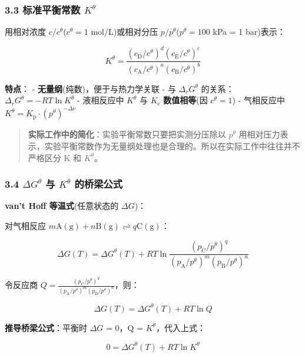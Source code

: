 \subsubsection{\texorpdfstring{3.3 标准平衡常数 \(K^\theta\)}{3.3 标准平衡常数 K\^{}\textbackslash theta}}\label{ux6807ux51c6ux5e73ux8861ux5e38ux6570-ktheta}

用相对浓度 \(c/c^\theta\)(\(c^\theta = 1\) mol/L)或相对分压 \(p/p^\theta\)(\(p^\theta = 100\) kPa = 1 bar)表示：

\[
K^\theta = \frac{(c_\mathrm{D}/c^\theta)^d(c_\mathrm{E}/c^\theta)^e}{(c_\mathrm{A}/c^\theta)^a(c_\mathrm{B}/c^\theta)^b}
\]

\textbf{特点}：
- \textbf{无量纲}(纯数)，便于与热力学关联
- 与 \(\Delta_r G^\theta\) 的关系：\(\Delta_r G^\theta = -RT\ln K^\theta\)
- 液相反应中 \(K^\theta\) 与 \(K_{\mathrm c}\) \textbf{数值相等}(因 \(c^\theta = 1\))
- 气相反应中 \(K^\theta = K_{\mathrm p} \cdot (p^\theta)^{-\Delta\nu}\)

\begin{quote}
\textbf{实际工作中的简化}：实验平衡常数只要把实测分压除以 \(p^\theta\) 用相对压力表示，实验平衡常数作为无量纲处理也是合理的。所以在实际工作中往往并不严格区分 K 和 \(K^\theta\)。
\end{quote}

\subsubsection{\texorpdfstring{3.4 \(\Delta G^\theta\) 与 \(K^\theta\) 的桥梁公式}{3.4 \textbackslash Delta G\^{}\textbackslash theta 与 K\^{}\textbackslash theta 的桥梁公式}}\label{delta-gtheta-ux4e0e-ktheta-ux7684ux6865ux6881ux516cux5f0f}

\textbf{van't Hoff 等温式}(任意状态的 \(\Delta G\))：

对气相反应 \(m\mathrm{A(g)} + n\mathrm{B(g)} \rightleftharpoons q\mathrm{C(g)}\)：

\[
\Delta G(T) = \Delta G^\theta(T) + RT\ln\frac{(p_\mathrm{C}/p^\theta)^q}{(p_\mathrm{A}/p^\theta)^m(p_\mathrm{B}/p^\theta)^n}
\]

令反应商 \(Q = \frac{(p_\mathrm{C}/p^\theta)^q}{(p_\mathrm{A}/p^\theta)^m(p_\mathrm{B}/p^\theta)^n}\)，则：

\[
\boxed{\Delta G(T) = \Delta G^\theta(T) + RT\ln Q}
\]

\textbf{推导桥梁公式}：平衡时 \(\Delta G\) = 0，Q = \(K^\theta\)，代入上式：

\[
0 = \Delta G^\theta(T) + RT\ln K^\theta
\]

